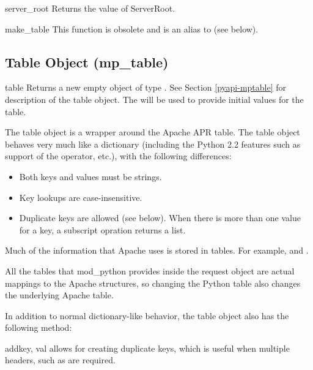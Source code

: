 \begin{funcdesc}{server_root}{}
Returns the value of ServerRoot.
\end{funcdesc}

\begin{funcdesc}{make_table}{} 
This function is obsolete and is an alias to  (see below).
\end{funcdesc}

\subsection{Table Object (mp_table)\label{pyapi-mptable}}

\begin{classdesc}{table}{}
Returns a new empty object of type . See Section
\ref{pyapi-mptable} for description of the table object. The
 will be used to provide initial values for
the table.  

The table object is a wrapper around the Apache APR table. The table
object behaves very much like a dictionary (including the Python 2.2
features such as support of the  operator, etc.), with the 
following differences:

\begin{itemize}
\item
Both keys and values must be strings.
\item
Key lookups are case-insensitive.
\item
Duplicate keys are allowed (see  below). When there is
more than one value for a key, a subscript opration returns a list.
\end{itemize}

Much of the information that Apache uses is stored in tables. For
example,  and .

All the tables that mod_python provides inside the request
object are actual mappings to the Apache structures, so changing the
Python table also changes the underlying Apache table.

In addition to normal dictionary-like behavior, the table object also
has the following method:

\begin{methoddesc}[table]{add}{key, val}
 allows for creating duplicate keys, which is useful 
when multiple headers, such as  are required.
\end{methoddesc}

\end{classdesc}

